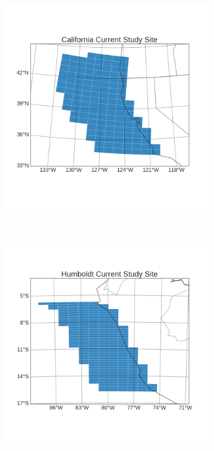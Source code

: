 \documentclass[12pt]{article}
\begin{document}
\begin{figure}[!h]
    \centering
    \begin{subfigure}[b]{0.4\textwidth}
        \centering
        \includegraphics[width=\linewidth]{../../figs/calcs/study-site/california-current-study-site.png}
    \end{subfigure}%
    ~ 
    \begin{subfigure}[b]{0.4\textwidth}
        \centering
        \includegraphics[width=\linewidth]{../../figs/humcs/study-site/humboldt-current-study-site.png}

\end{subfigure}
\end{figure}
\end{document}
